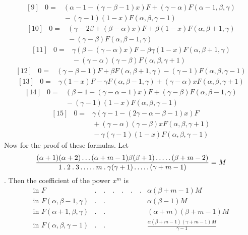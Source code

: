 \[
\begin{array}{rcl}
{[9]}&0=&(\alpha-1-(\gamma-\beta-1)x)F+(\gamma-\alpha)F(\alpha-1,\beta,\gamma)\\
&&{}-(\gamma-1)(1-x)F(\alpha,\beta,\gamma-1)
\end{array}
\]
\[
\begin{array}{rcl}
{[10]}&0=&(\gamma-2\beta+(\beta-\alpha)x)F+\beta(1-x)F(\alpha,\beta+1,\gamma)\\
&&{}-(\gamma-\beta)F(\alpha,\beta-1,\gamma)
\end{array}
\]
\[
\begin{array}{rcl}
{[11]}&0=&\gamma(\beta-(\gamma-\alpha)x)F-\beta\gamma(1-x)F(\alpha,\beta+1,\gamma)\\
&&{}-(\gamma-\alpha)(\gamma-\beta)F(\alpha,\beta,\gamma+1)
\end{array}
\]
\[
\begin{array}{rcl}
{[12]}&0=&(\gamma-\beta-1)F+\beta F(\alpha,\beta+1,\gamma)-(\gamma-1)F(\alpha,\beta,\gamma-1)
\end{array}
\]
\[
\begin{array}{rcl}
{[13]}&0=&\gamma(1-x)F-\gamma F(\alpha,\beta-1,\gamma)+(\gamma-\alpha)xF(\alpha,\beta,\gamma+1)
\end{array}
\]
\[
\begin{array}{rcl}
{[14]}&0=&(\beta-1-(\gamma-\alpha-1)x)F+(\gamma-\beta)F(\alpha,\beta-1,\gamma)\\
&&{}-(\gamma-1)(1-x)F(\alpha,\beta,\gamma-1)
\end{array}
\]
\[
\begin{array}{rcl}
{[15]}&0=&\gamma(\gamma-1-(2\gamma-\alpha-\beta-1)x)F\\
&&{}+(\gamma-\alpha)(\gamma-\beta)xF(\alpha,\beta,\gamma+1)\\
&&{}-\gamma(\gamma-1)(1-x)F(\alpha,\beta,\gamma-1)
\end{array}
\]
Now for the proof of these formulas. Let
\[
\frac{(\alpha+1)(\alpha+2)\mathinner{.\,.\,.}(\alpha+m-1)\beta(\beta+1)\mathinner{.\,.\,.\,.\,.}(\beta+m-2)}{1\mathbin{.}2\mathbin{.}3\mathinner{.\,.\,.\,.\,.}m\mathbin{.}\gamma(\gamma+1)\mathinner{.\,.\,.\,.\,.}(\gamma+m-1)}=M
\].
Then the coefficient of the power $x^m$ is
\[
\begin{array}{lll}
\mbox{in }F&.\quad.\quad.\quad.\quad.\quad.&\alpha(\beta+m-1)M\\
\mbox{in }F(\alpha,\beta-1,\gamma)&.\quad.&\alpha(\beta-1)M\\
\mbox{in }F(\alpha+1,\beta,\gamma)&.\quad.&(\alpha+m)(\beta+m-1)M\\
\mbox{in }F(\alpha,\beta,\gamma-1)&.\quad.&\frac{\alpha(\beta+m-1)(\gamma+m-1)M}{\gamma-1}
\end{array}
\]

